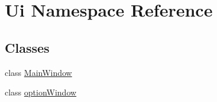 \hypertarget{namespaceUi}{}\section{Ui Namespace Reference}
\label{namespaceUi}
\subsection*{Classes}
\begin{DoxyCompactItemize}
\item 
class \hyperlink{classUi_1_1MainWindow}{Main\+Window}
\item 
class \hyperlink{classUi_1_1optionWindow}{option\+Window}
\end{DoxyCompactItemize}
